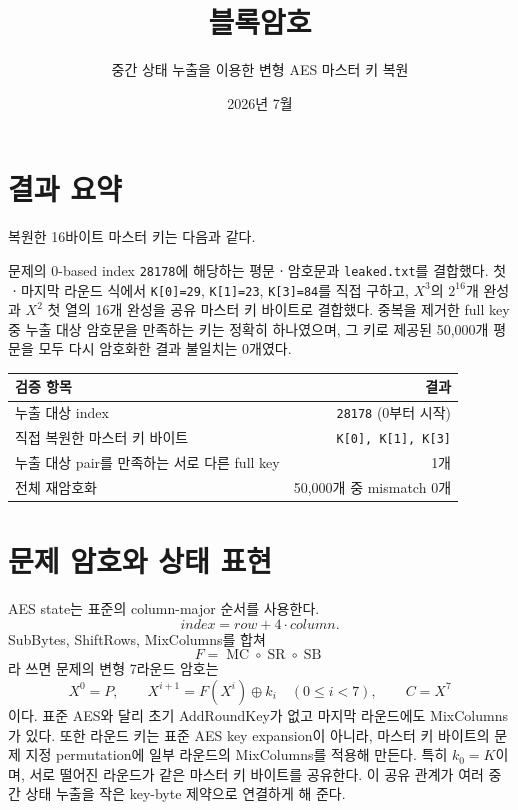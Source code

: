 \documentclass[10pt,a4paper]{article}
\title{블록암호}
\author{중간 상태 누출을 이용한 변형 AES 마스터 키 복원}
\date{2026년 7월}
\begin{document}
\maketitle

\section*{결과 요약}

복원한 16바이트 마스터 키는 다음과 같다.

\begin{center}
\end{center}

문제의 0-based index \texttt{28178}에 해당하는 평문ㆍ암호문과
\texttt{leaked.txt}를 결합했다. 첫ㆍ마지막 라운드 식에서
\texttt{K[0]=29}, \texttt{K[1]=23}, \texttt{K[3]=84}를 직접 구하고,
$X^3$의 $2^{16}$개 완성과 $X^2$ 첫 열의 16개 완성을 공유
마스터 키 바이트로 결합했다. 중복을 제거한 full key 중 누출 대상
암호문을 만족하는 키는 정확히 하나였으며, 그 키로 제공된 50,000개
평문을 모두 다시 암호화한 결과 불일치는 0개였다.

\begin{center}
\begin{tabular}{lr}
\toprule
검증 항목 & 결과 \\
\midrule
누출 대상 index & \texttt{28178} (0부터 시작) \\
직접 복원한 마스터 키 바이트 & \texttt{K[0], K[1], K[3]} \\
누출 대상 pair를 만족하는 서로 다른 full key & 1개 \\
전체 재암호화 & 50,000개 중 mismatch 0개 \\
\bottomrule
\end{tabular}
\end{center}

\section{문제 암호와 상태 표현}

AES state는 표준의 column-major 순서를 사용한다.
\[
  \mathit{index}=\mathit{row}+4\mathbin{\cdot}\mathit{column}.
\]
SubBytes, ShiftRows, MixColumns를 합쳐
\[
  F=\operatorname{MC}\circ\operatorname{SR}\circ\operatorname{SB}
\]
라 쓰면 문제의 변형 7라운드 암호는
\[
  X^0=P,\qquad X^{i+1}=F(X^i)\oplus k_i\quad(0\le i<7),
  \qquad C=X^7
\]
이다. 표준 AES와 달리 초기 AddRoundKey가 없고 마지막 라운드에도
MixColumns가 있다. 또한 라운드 키는 표준 AES key expansion이 아니라,
마스터 키 바이트의 문제 지정 permutation에 일부 라운드의 MixColumns를
적용해 만든다. 특히 $k_0=K$이며, 서로 떨어진 라운드가 같은 마스터 키
바이트를 공유한다. 이 공유 관계가 여러 중간 상태 누출을 작은
key-byte 제약으로 연결하게 해 준다.
\end{document}
